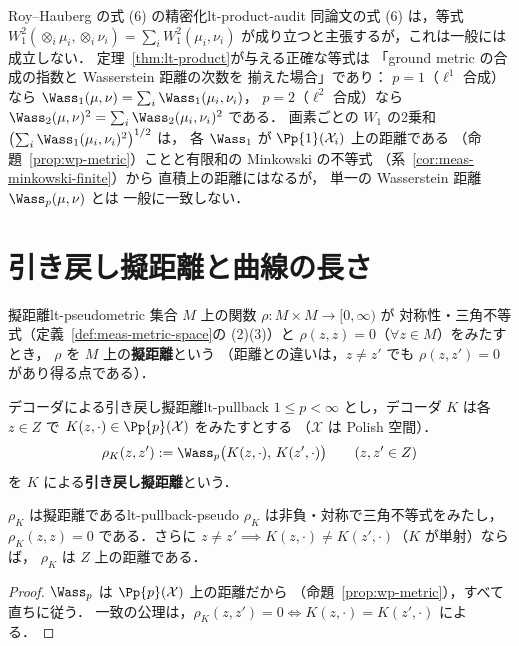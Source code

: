 \begin{remark}{Roy--Hauberg の式 (6) の精密化}{lt-product-audit}
  同論文の式 (6) は，等式
  $W_1^2(\otimes_i\mu_i,\otimes_i\nu_i)=\sum_iW_1^2(\mu_i,\nu_i)$
  が成り立つと主張するが，これは一般には成立しない．
  定理~\ref{thm:lt-product}が与える正確な等式は
  「ground metric の合成の指数と Wasserstein 距離の次数を
  揃えた場合」であり：
  $p=1$（$\ell^1$ 合成）なら
  $\Wass_1(\mu,\nu)=\sum_i\Wass_1(\mu_i,\nu_i)$，
  $p=2$（$\ell^2$ 合成）なら
  $\Wass_2(\mu,\nu)^2=\sum_i\Wass_2(\mu_i,\nu_i)^2$ である．
  画素ごとの $W_1$ の2乗和
  $\bigl(\sum_i\Wass_1(\mu_i,\nu_i)^2\bigr)^{1/2}$ は，
  各 $\Wass_1$ が $\Pp{1}(\mathcal{X}_i)$ 上の距離である
  （命題~\ref{prop:wp-metric}）ことと有限和の Minkowski の不等式
  （系~\ref{cor:meas-minkowski-finite}）から
  直積上の距離にはなるが，
  単一の Wasserstein 距離 $\Wass_p(\mu,\nu)$ とは
  一般に一致しない．
\end{remark}

\section{引き戻し擬距離と曲線の長さ}
\label{sec:lt-pullback}

\begin{definition}{擬距離}{lt-pseudometric}
  集合 $M$ 上の関数 $\rho\colon M\times M\to[0,\infty)$ が
  対称性・三角不等式（定義~\ref{def:meas-metric-space}の (2)(3)）と
  $\rho(z,z)=0$（$\forall z\in M$）をみたすとき，
  $\rho$ を $M$ 上の\textbf{擬距離}という
  （距離との違いは，$z\neq z'$ でも $\rho(z,z')=0$ があり得る点である）．
\end{definition}

\begin{definition}{デコーダによる引き戻し擬距離}{lt-pullback}
  $1\leq p<\infty$ とし，デコーダ $K$ は各 $z\in Z$ で
  $K(z,\cdot)\in\Pp{p}(\mathcal{X})$ をみたすとする
  （$\mathcal{X}$ は Polish 空間）．
  \[
    \rho_K(z,z'):=\Wass_p\bigl(K(z,\cdot),\,K(z',\cdot)\bigr)
    \qquad(z,z'\in Z)
  \]
  を $K$ による\textbf{引き戻し擬距離}という．
\end{definition}

\begin{claim}{$\rho_K$ は擬距離である}{lt-pullback-pseudo}
  $\rho_K$ は非負・対称で三角不等式をみたし，
  $\rho_K(z,z)=0$ である．さらに
  $z\neq z'\implies K(z,\cdot)\neq K(z',\cdot)$（$K$ が単射）ならば，
  $\rho_K$ は $Z$ 上の距離である．
\end{claim}

\begin{proof}
  $\Wass_p$ は $\Pp{p}(\mathcal{X})$ 上の距離だから
  （命題~\ref{prop:wp-metric}），すべて直ちに従う．
  一致の公理は，$\rho_K(z,z')=0\iff K(z,\cdot)=K(z',\cdot)$ による．
\end{proof}

